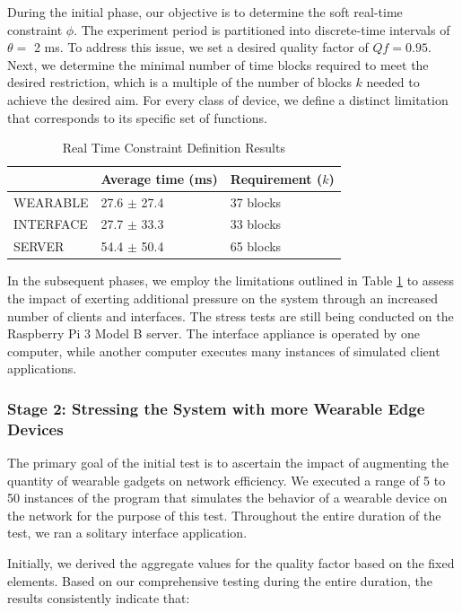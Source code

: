 During the initial phase, our objective is to determine the soft real-time constraint $\phi$. The experiment period is partitioned into discrete-time intervals of $\theta=$ 2 ms. To address this issue, we set a desired quality factor of $Qf = 0.95$. Next, we determine the minimal number of time blocks required to meet the desired restriction, which is a multiple of the number of blocks $k$ needed to achieve the desired aim. For every class of device, we define a distinct limitation that corresponds to its specific set of functions. 

\begin{table}[h!]
\centering
\caption{Real Time Constraint Definition Results}
\label{tab:rt-def}
\begin{tabular}{lll}
\hline
 & Average time (ms) & Requirement ($k$) \\ \hline
\multicolumn{1}{l}{WEARABLE} & 27.6 $\pm$ 27.4 & 37 blocks \\ %
\multicolumn{1}{l}{INTERFACE} & 27.7 $\pm$ 33.3 & 33 blocks \\ %
\multicolumn{1}{l}{SERVER} & 54.4 $\pm$ 50.4 & 65 blocks \\ \hline
\end{tabular}
\end{table}

In the subsequent phases, we employ the limitations outlined in Table \ref{tab:rt-def} to assess the impact of exerting additional pressure on the system through an increased number of clients and interfaces. The stress tests are still being conducted on the Raspberry Pi 3 Model B server. The interface appliance is operated by one computer, while another computer executes many instances of simulated client applications.

\subsubsection{Stage 2: Stressing the System with more Wearable Edge Devices}

The primary goal of the initial test is to ascertain the impact of augmenting the quantity of wearable gadgets on network efficiency. We executed a range of 5 to 50 instances of the program that simulates the behavior of a wearable device on the network for the purpose of this test. Throughout the entire duration of the test, we ran a solitary interface application.

Initially, we derived the aggregate values for the quality factor based on the fixed elements. Based on our comprehensive testing during the entire duration, the results consistently indicate that:

